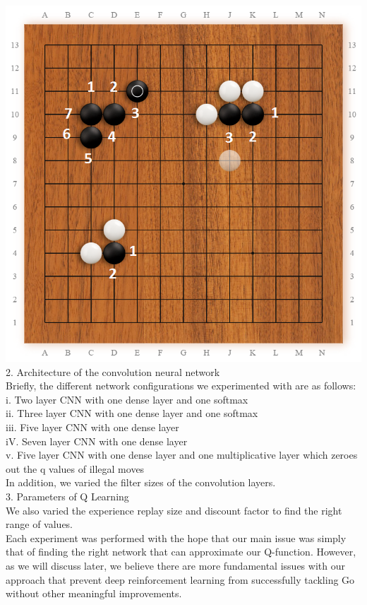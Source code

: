 \includegraphics[scale=0.25]{ExampleLiberties}
\\
2. Architecture of the convolution neural network
\\
Briefly, the different network configurations we experimented with are as follows:
\\
i. Two layer CNN with one dense layer and one softmax
\\
ii. Three layer CNN with one dense layer and one softmax
\\
iii. Five layer CNN with one dense layer
\\
iV. Seven layer CNN with one dense layer
\\
v. Five layer CNN with one dense layer and one multiplicative layer which zeroes out the q values of illegal moves
\\
In addition, we varied the filter sizes of the convolution layers.
\\
3. Parameters of Q Learning
\\
We also varied the experience replay size and discount factor to find the right range of values. 
\\
Each experiment was performed with the hope that our main issue was simply that of finding the right network that can approximate our Q-function. However, as we will discuss later, we believe there are more fundamental issues with our approach that prevent deep reinforcement learning from successfully tackling Go without other meaningful improvements.
